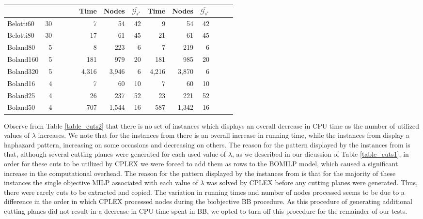 \documentclass[11.5pt]{article}
\begin{document}
\begin{table}
\begin{tabular}{l|r|rrr|rrrrrrrrr}
 &  &  &  &  & Time & Nodes & $\overline{\mathcal{G}_{s^*}}$ & Time & Nodes & $\overline{\mathcal{G}_{s^*}}$   \\ 
\midrule
Belotti60 & 30 &&&& 7 & 54 & 42 & 9 & 54 & 42\\
Belotti80 & 30 &&&& 17 & 61 & 45 & 21 & 61 & 45\\
\midrule
Boland80 & 5 & &&& 8 & 223 & 6 & 7 & 219 & 6\\
Boland160 & 5 & &&& 181 & 979 & 20 & 181 & 985 & 20\\
Boland320 & 5 & &&& 4,316 & 3,946 & 6 & 4,216 & 3,870 & 6 \\
Boland16 & 4 & &&&7 & 60 & 10 & 7 & 60 & 10\\
Boland25 & 4 & &&&26 & 237 & 52 & 23 & 221 & 52 \\
Boland50 & 4 & &&&707 & 1,544 & 16 & 587 & 1,342 & 16  \\
\bottomrule
\end{tabular}
\end{table}

Observe from Table \ref{table_cuts2} that there is no set of instances which displays an overall decrease in CPU time as the number of utilized values of $\lambda$ increases. We note that for the instances from \citep{belotti2012biobjective} there is an overall increase in running time, while the instances from \citep{boland2015acriterion} display a haphazard pattern, increasing on some occasions and decreasing on others. The reason for the pattern displayed by the instances from \citep{belotti2012biobjective} is that, although several cutting planes were generated for each used value of $\lambda$, as we described in our dicussion of Table \ref{table_cuts1}, in order for these cuts to be utilized by CPLEX we were forced to add them as rows to the BOMILP model, which caused a significant increase in the computational overhead. The reason for the pattern displayed by the instances from \citep{boland2015acriterion} is that for the majority of these instances the single objective MILP associated with each value of $\lambda$ was solved by CPLEX before any cutting planes were generated. Thus, there were rarely cuts to be extracted and copied. The variation in running times and number of nodes processed seems to be due to a difference in the order in which CPLEX processed nodes during the biobjective BB procedure. As this procedure of generating additional cutting planes did not result in a decrease in CPU time spent in BB, we opted to turn off this procedure for the remainder of our tests.
\end{document}
